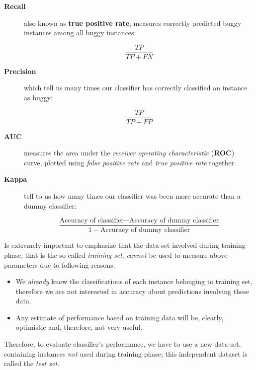 \documentclass[sigconf]{acmart}
\begin{document}
\begin{description}

\item[\textbf{Recall}] also known as \textbf{true positive rate}, measures correctly predicted buggy instances among all buggy instances:

\begin{equation}
\dfrac{TP}{TP + FN}
\end{equation}

\item[\textbf{Precision}] which tell us many times our classifier has correctly classified an instance as buggy:

\begin{equation}
\dfrac{TP}{TP + FP}
\end{equation}

\item[\textbf{AUC}] measures the area under the \textit{receiver operating characteristic} (\textbf{ROC}) curve, plotted using \textit{false positive rate} and \textit{true positive rate} together.

\item[\textbf{Kappa}] tell to us how many times our classifier was been more accurate than a dummy classifier:

\begin{equation}
\dfrac{\text{Accuracy of classifier} - \text{Accuracy of dummy classifier}}{1 - \text{Accuracy of dummy classifier}}
\end{equation}

\end{description}

Is extremely important to emphasize that the data-set involved during training phase, that is the so called \textit{training set}, \textit{cannot} be used to measure above parameters due to following reasons:
\begin{itemize}

\item We \textit{already} know the classifications of each instance belonging to training set, therefore we are not interested in accuracy about predictions involving these data.

\item Any estimate of performance based on training data will be, clearly, optimistic and, therefore, not very useful.
\end{itemize}

Therefore, to evaluate classifier's performance, we have to use a new data-set, containing instances \textit{not} used during training phase; this independent dataset is called the \textit{test set}. 
\end{document}
